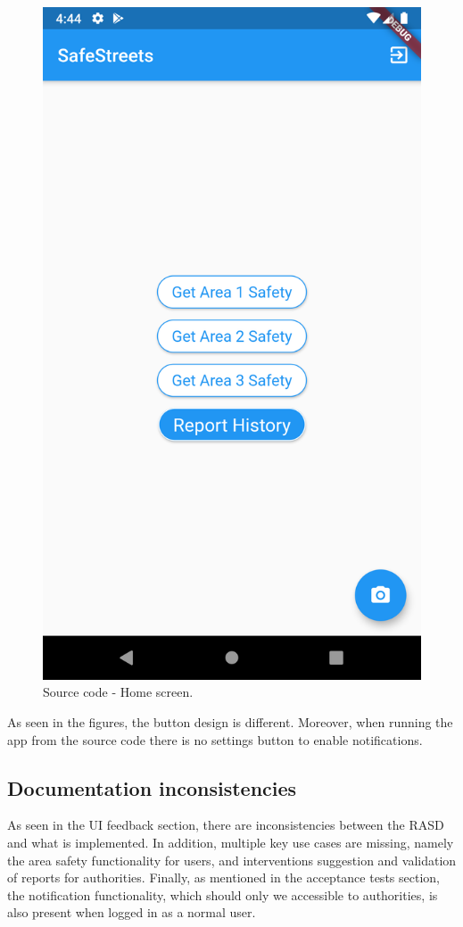 \begin{figure}[H]
\begin{minipage}{.465\textwidth}
        \includegraphics[width=.8\textwidth]{Images/source-home.png}
        \caption{\label{fig:source-home}Source code - Home screen.}
    \end{minipage}
    \end{figure}

As seen in the figures, the button design is different. Moreover, when running the app from the source code there is no settings button to enable notifications.

\subsection{Documentation inconsistencies}
As seen in the UI feedback section, there are inconsistencies between the RASD and what is implemented. In addition, multiple key use cases are missing, namely the area safety functionality for users, and interventions suggestion and validation of reports for authorities.
Finally, as mentioned in the acceptance tests section, the notification functionality, which should only we accessible to authorities, is also present when logged in as a normal user.
